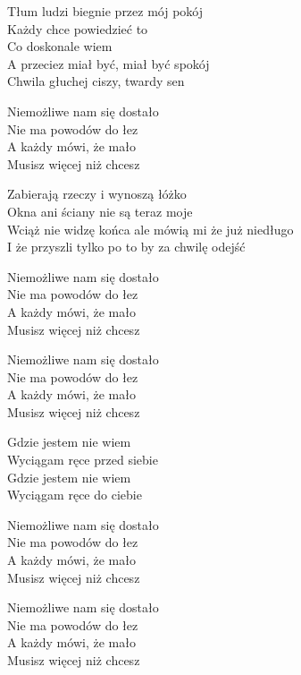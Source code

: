 \begin{text}
    Tłum ludzi biegnie przez mój pokój\\
    Każdy chce powiedzieć to\\
    Co doskonale wiem\\
    A przeciez miał być, miał być spokój\\
    Chwila głuchej ciszy, twardy sen

    Niemożliwe nam się dostało\\
    Nie ma powodów do łez\\
    A każdy mówi, że mało\\
    Musisz więcej niż chcesz

    Zabierają rzeczy i wynoszą łóżko\\
    Okna ani ściany nie są teraz moje\\
    Wciąż nie widzę końca ale mówią mi że już niedługo\\
    I że przyszli tylko po to by za chwilę odejść

    Niemożliwe nam się dostało\\
    Nie ma powodów do łez\\
    A każdy mówi, że mało\\
    Musisz więcej niż chcesz

    Niemożliwe nam się dostało\\
    Nie ma powodów do łez\\
    A każdy mówi, że mało\\
    Musisz więcej niż chcesz

    Gdzie jestem nie wiem\\
    Wyciągam ręce przed siebie\\
    Gdzie jestem nie wiem\\
    Wyciągam ręce do ciebie

    Niemożliwe nam się dostało\\
    Nie ma powodów do łez\\
    A każdy mówi, że mało\\
    Musisz więcej niż chcesz

    Niemożliwe nam się dostało\\
    Nie ma powodów do łez\\
    A każdy mówi, że mało\\
    Musisz więcej niż chcesz
\end{text}
\begin{chord}

\end{chord}